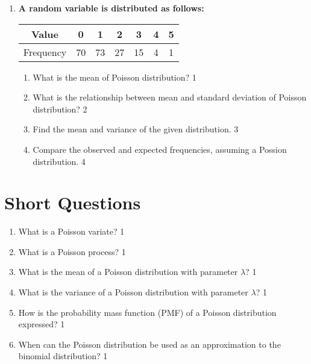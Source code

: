 \documentclass[a4paper,oneside, margin=1.4in]{book}
\begin{document}
\begin{enumerate}
 \item
	  \textbf{A random variable is distributed as follows:} 
	  
	  \begin{table}[h]
	  \centering
\begin{tabular}{ccccccc}
Value & 0 & 1 & 2 & 3 & 4 & 5 \\ \hline
Frequency & 70 & 73 & 27 & 15 & 4 & 1
\end{tabular}
\end{table}
  
  \begin{enumerate}
    \item
	What is the mean of Poisson distribution? \hfill 1
    \item
	What is the relationship between mean and standard deviation of Poisson distribution? \hfill 2
    \item  
	Find the mean and variance of the given distribution. \hfill 3
    \item
	Compare the observed and expected frequencies, assuming a Possion distribution. \hfill 4
  \end{enumerate}

  \end{enumerate}

\section{Short Questions}

\begin{enumerate}

  \item What is a Poisson variate? \hfill 1
  
  \item What is a Poisson process?  \hfill 1
  
  \item What is the mean of a Poisson distribution with parameter \( \lambda \)? \hfill 1

\item What is the variance of a Poisson distribution with parameter \( \lambda \)? \hfill 1

\item How is the probability mass function (PMF) of a Poisson distribution expressed? \hfill 1

\item When can the Poisson distribution be used as an approximation to the binomial distribution? \hfill 1


\end{enumerate}
\end{document}
